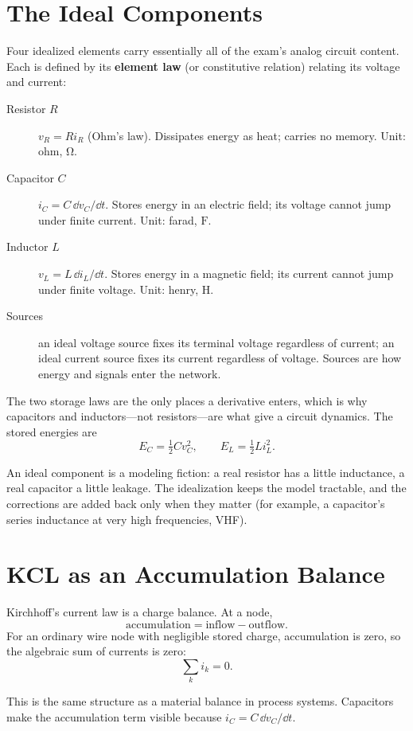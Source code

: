 \section{The Ideal Components}
Four idealized elements carry essentially all of the exam's analog circuit
content. Each is defined by its \textbf{element law} (or constitutive relation)
relating its voltage and current:
\begin{description}
\item[Resistor \(R\)] \(v_R=Ri_R\) (Ohm's law). Dissipates energy as heat;
carries no memory. Unit: ohm, \(\si{\ohm}\).
\item[Capacitor \(C\)] \(i_C=C\,\dd v_C/\dd t\). Stores energy in an electric
field; its voltage cannot jump under finite current. Unit: farad, \(\si{\farad}\).
\item[Inductor \(L\)] \(v_L=L\,\dd i_L/\dd t\). Stores energy in a magnetic
field; its current cannot jump under finite voltage. Unit: henry, \(\si{\henry}\).
\item[Sources] an ideal voltage source fixes its terminal voltage regardless of
current; an ideal current source fixes its current regardless of voltage. Sources
are how energy and signals enter the network.
\end{description}
The two storage laws are the only places a derivative enters, which is why
capacitors and inductors---not resistors---are what give a circuit dynamics. The
stored energies are
\[
E_C=\tfrac{1}{2}Cv_C^2,\qquad
E_L=\tfrac{1}{2}Li_L^2.
\]

\begin{physicalbox}
An ideal component is a modeling fiction: a real resistor has a little
inductance, a real capacitor a little leakage. The idealization keeps the model
tractable, and the corrections are added back only when they matter (for example,
a capacitor's series inductance at very high frequencies, VHF).
\end{physicalbox}

\section{KCL as an Accumulation Balance}
Kirchhoff's current law is a charge balance. At a node,
\[
\text{accumulation}=\text{inflow}-\text{outflow}.
\]
For an ordinary wire node with negligible stored charge, accumulation is zero,
so the algebraic sum of currents is zero:
\[
\sum_k i_k=0.
\]

\begin{controlsbox}
This is the same structure as a material balance in process systems. Capacitors
make the accumulation term visible because \(i_C=C\,\dd v_C/\dd t\).
\end{controlsbox}

